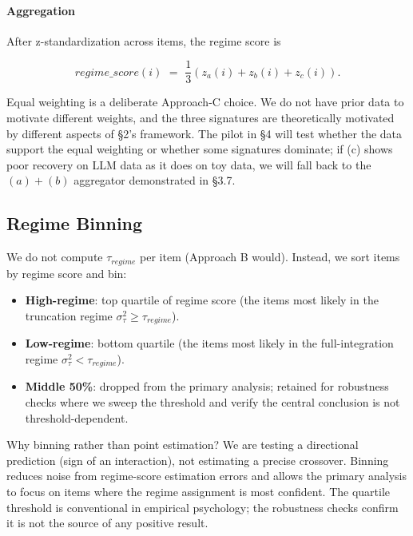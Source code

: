 \documentclass{article}
\providecommand{\tightlist}{\setlength{\itemsep}{0pt}\setlength{\parskip}{0pt}}
\begin{document}
\paragraph{Aggregation}\label{aggregation}

After z-standardization across items, the regime score is

\[regime\_ score(i)\mspace{6mu} = \mspace{6mu}\frac{1}{3}\left( z_{a}(i) + z_{b}(i) + z_{c}(i) \right).\]

Equal weighting is a deliberate Approach-C choice. We do not have prior
data to motivate different weights, and the three signatures are
theoretically motivated by different aspects of \S{}2's framework. The
pilot in \S{}4 will test whether the data support the equal weighting or
whether some signatures dominate; if (c) shows poor recovery on LLM data
as it does on toy data, we will fall back to the \((a) + (b)\)
aggregator demonstrated in \S{}3.7.

\subsection{Regime Binning}\label{regime-binning}

We do not compute \(\tau_{regime}\) per item (Approach B would).
Instead, we sort items by regime score and bin:

\begin{itemize}
\tightlist
\item
  \textbf{High-regime}: top quartile of regime score (the items most
  likely in the truncation regime
  \(\sigma_{\tau}^{2} \geq \tau_{regime}\)).
\item
  \textbf{Low-regime}: bottom quartile (the items most likely in the
  full-integration regime \(\sigma_{\tau}^{2} < \tau_{regime}\)).
\item
  \textbf{Middle 50\%}: dropped from the primary analysis; retained for
  robustness checks where we sweep the threshold and verify the central
  conclusion is not threshold-dependent.
\end{itemize}

Why binning rather than point estimation? We are testing a directional
prediction (sign of an interaction), not estimating a precise crossover.
Binning reduces noise from regime-score estimation errors and allows the
primary analysis to focus on items where the regime assignment is most
confident. The quartile threshold is conventional in empirical
psychology; the robustness checks confirm it is not the source of any
positive result.
\end{document}
